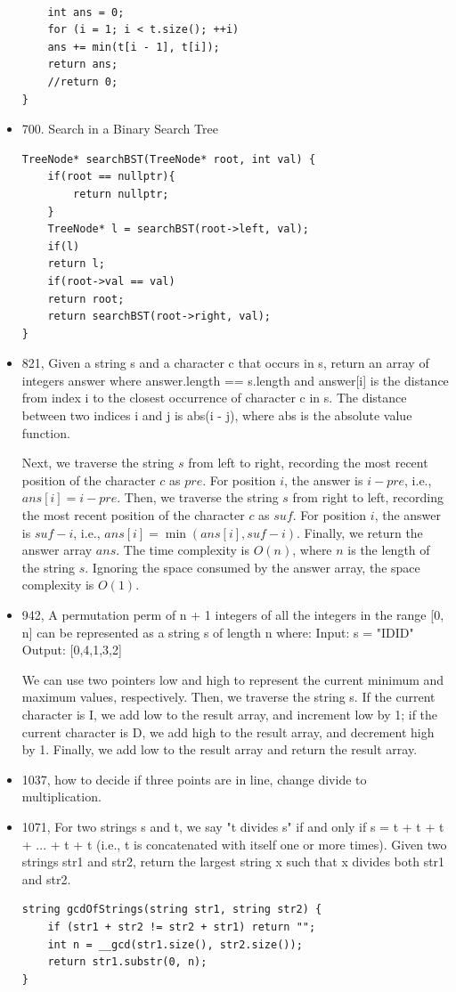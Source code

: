 \documentclass[a4paper,11pt,twoside]{book}
\begin{document}
\begin{itemize}
\begin{lstlisting}
	
	int ans = 0;
	for (i = 1; i < t.size(); ++i) 
	ans += min(t[i - 1], t[i]);
	return ans;
	//return 0;
}
\end{lstlisting}	
	
	\item  700. Search in a Binary Search Tree
\begin{lstlisting}
TreeNode* searchBST(TreeNode* root, int val) {
	if(root == nullptr){
		return nullptr;
	}
	TreeNode* l = searchBST(root->left, val);
	if(l)
	return l;
	if(root->val == val)
	return root;
	return searchBST(root->right, val);
}
\end{lstlisting}

	\item 821, Given a string s and a character c that occurs in s, return an array of integers answer where answer.length == s.length and answer[i] is the distance from index i to the closest occurrence of character c in s. The distance between two indices i and j is abs(i - j), where abs is the absolute value function.

Next, we traverse the string $s$ from left to right, recording the most recent position of the character $c$ as $pre$. For position $i$, the answer is $i - pre$, i.e., $ans[i] = i - pre$. Then, we traverse the string $s$ from right to left, recording the most recent position of the character $c$ as $suf$. For position $i$, the answer is $suf - i$, i.e., $ans[i] = \min(ans[i], suf - i)$. Finally, we return the answer array $ans$. The time complexity is $O(n)$, where $n$ is the length of the string $s$. Ignoring the space consumed by the answer array, the space complexity is $O(1)$.	

	\item 942,  A permutation perm of n + 1 integers of all the integers in the range [0, n] can be represented as a string s of length n where: Input: s = "IDID" Output: [0,4,1,3,2] 
	
	We can use two pointers low and high to represent the current minimum and maximum values, respectively. Then, we traverse the string s. If the current character is I, we add low to the result array, and increment low by 1; if the current character is D, we add high to the result array, and decrement high by 1. Finally, we add low to the result array and return the result array.

	\item  1037,  how to decide if three points are in line, change divide to multiplication. 
	
	\item 1071, For two strings s and t, we say "t divides s" if and only if s = t + t + t + ... + t + t (i.e., t is concatenated with itself one or more times). Given two strings str1 and str2, return the largest string x such that x divides both str1 and str2.
\begin{lstlisting}
string gcdOfStrings(string str1, string str2) {
	if (str1 + str2 != str2 + str1) return "";
	int n = __gcd(str1.size(), str2.size());
	return str1.substr(0, n);
}
\end{lstlisting}
	

\end{itemize}
\end{document}

